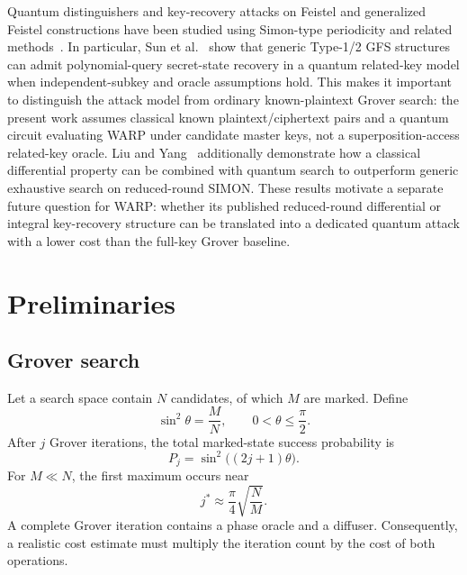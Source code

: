 \documentclass[10pt,a4paper]{article}
\begin{document}
Quantum distinguishers and key-recovery attacks on Feistel and generalized Feistel constructions have been studied using Simon-type periodicity and related methods~\cite{Dong2019,Hodzic2022,Sun2023,Sun2026}. In particular, Sun et al.~\cite{Sun2026} show that generic Type-1/2 GFS structures can admit polynomial-query secret-state recovery in a quantum related-key model when independent-subkey and oracle assumptions hold. This makes it important to distinguish the attack model from ordinary known-plaintext Grover search: the present work assumes classical known plaintext/ciphertext pairs and a quantum circuit evaluating WARP under candidate master keys, not a superposition-access related-key oracle. Liu and Yang~\cite{LiuYang2020} additionally demonstrate how a classical differential property can be combined with quantum search to outperform generic exhaustive search on reduced-round SIMON. These results motivate a separate future question for WARP: whether its published reduced-round differential or integral key-recovery structure can be translated into a dedicated quantum attack with a lower cost than the full-key Grover baseline.

\section{Preliminaries}

\subsection{Grover search}
Let a search space contain $N$ candidates, of which $M$ are marked. Define
\begin{equation}
    \sin^2\theta = \frac{M}{N}, \qquad 0<\theta\le \frac{\pi}{2}.
\end{equation}
After $j$ Grover iterations, the total marked-state success probability is
\begin{equation}
    P_j = \sin^2\bigl((2j+1)\theta\bigr).
    \label{eq:grover_success}
\end{equation}
For $M\ll N$, the first maximum occurs near
\begin{equation}
    j^* \approx \frac{\pi}{4}\sqrt{\frac{N}{M}}.
    \label{eq:grover_iterations}
\end{equation}
A complete Grover iteration contains a phase oracle and a diffuser. Consequently, a realistic cost estimate must multiply the iteration count by the cost of both operations.
\end{document}
